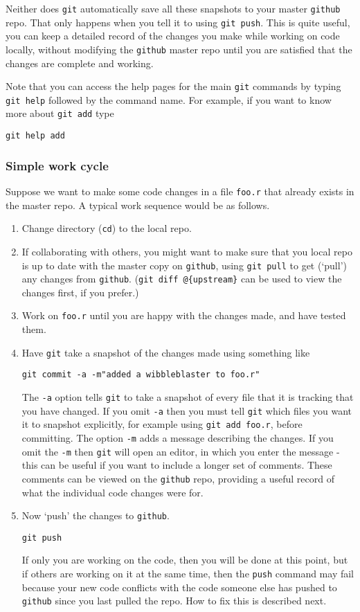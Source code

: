 \documentclass[10pt] {article}
\theoremstyle{definition}
\begin{document}
Neither does {\tt git} automatically save all these snapshots to your master {\tt github} repo. That only happens when you tell it to using {\tt git push}. This is quite useful, you can keep a detailed record of the changes you make while working on code locally, without modifying the {\tt github} master repo until you are satisfied that the changes are complete and working.   

Note that you can access the help pages for the main {\tt git} commands by typing {\tt git help} followed by the command name. For example, if you want to know more about {\tt git add} type
\begin{verbatim}
git help add
\end{verbatim}

\subsubsection{Simple work cycle}

Suppose we want to make some code changes in a file \verb+foo.r+ that already exists in the master repo. A typical work sequence would be as follows.
\begin{enumerate}
\item  Change directory ({\tt cd}) to the local repo. 
\item If collaborating with others, you might want to make sure that you local repo is up to date with the master copy on {\tt github}, using \verb+git pull+ to get (`pull') any changes from {\tt github}. (\verb+git diff @{upstream}+ can be used to view the changes first, if you prefer.) 
\item Work on {\tt foo.r} until you are happy with the changes made, and have tested them. 
\item Have {\tt git} take a snapshot of the changes made using something like 
\begin{verbatim}
git commit -a -m"added a wibbleblaster to foo.r"
\end{verbatim}  
The \verb+-a+ option tells {\tt git} to take a snapshot of every file that it is tracking that you have changed. If you omit \verb+-a+ then you must tell {\tt git} which files you want it to snapshot explicitly, for example using \verb+git add foo.r+, before committing. The option \verb+-m+ adds a message describing the changes. If you omit the \verb"-m" then {\tt git} will open an editor, in which you enter the message - this can be useful if you want to include a longer set of comments. These comments can be viewed on the {\tt github} repo, providing a useful record of what the individual code changes were for.  
\item Now `push' the changes to {\tt github}. 
\begin{verbatim}
git push
\end{verbatim}
If only you are working on the code, then you will be done at this point, but if others are working on it at the same time, then the {\tt push} command may fail because your new code conflicts with the code someone else has pushed to {\tt github} since you last pulled the repo. How to fix this is described next. 
\end{enumerate} 
\end{document}
